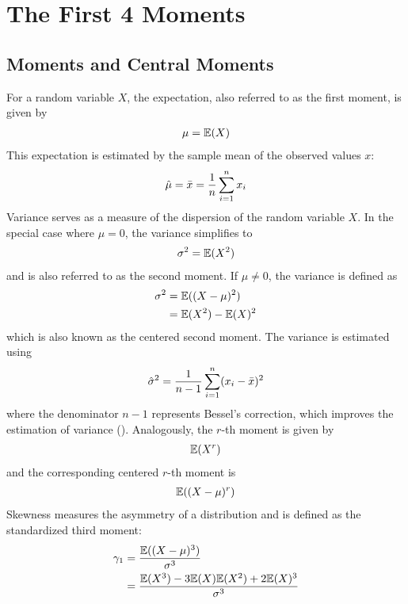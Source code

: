 \chapter{The First 4 Moments}
\label{sec:moments}

\section{Moments and Central Moments}

For a random variable $X$, the expectation, also referred to as the first moment, is given by
\begin{align}
    \mu = \mathbb{E}(X)\notag
\end{align}
This expectation is estimated by the sample mean of the observed values $x$:
\begin{align}
    \hat{\mu} = \bar{x} = \frac{1}{n}\sum_{i=1}^{n}x_i\notag
\end{align}
Variance serves as a measure of the dispersion of the random variable $X$. In the special case where $\mu = 0$, the variance simplifies to
\begin{align}
    \sigma^2 = \mathbb{E}(X^2)\notag
\end{align}
and is also referred to as the second moment. If $\mu \neq 0$, the variance is defined as
\begin{align}
    \label{eq:definition_variance}
    \sigma^2 &= \mathbb{E}((X-\mu)^2) \\
    &= \mathbb{E}(X^2) - \mathbb{E}(X)^2 \notag
\end{align}
which is also known as the centered second moment. The variance is estimated using
\begin{align}
    \hat{\sigma}^2 = \frac{1}{n-1}\sum_{i=1}^{n}(x_i-\bar{x})^2\notag
\end{align}
where the denominator $n-1$ represents Bessel's correction, which improves the estimation of variance (\cite{radziwillStatisticsEasierWay2017}). Analogously, the $r$-th moment is given by
\begin{align}
    \mathbb{E}(X^r)\notag
\end{align}
and the corresponding centered $r$-th moment is
\begin{align}
    \mathbb{E}((X-\mu)^r)\notag
\end{align}
Skewness measures the asymmetry of a distribution and is defined as the standardized third moment:
\begin{align}
    \label{eq:definition_skewness}
    \gamma_1 &= \frac{\mathbb{E}((X-\mu)^3)}{\sigma^3} \\
    &= \frac{\mathbb{E}(X^3) - 3\mathbb{E}(X)\mathbb{E}(X^2) + 2\mathbb{E}(X)^3}{\sigma^3} \notag
\end{align}
